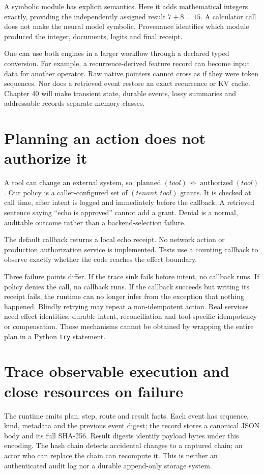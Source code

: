 A symbolic module has explicit semantics. Here it adds mathematical integers
exactly, providing the independently assigned result $7+8=15$. A calculator
call does not make the neural model symbolic. Provenance identifies which
module produced the integer, documents, logits and final receipt.

One can use both engines in a larger workflow through a declared typed
conversion. For example, a recurrence-derived feature record can become input
data for another operator. Raw native pointers cannot cross as if they were
token sequences. Nor does a retrieved event restore an exact recurrence or KV
cache. Chapter 40 will make transient state, durable events, lossy summaries
and addressable records separate memory classes.

\section{Planning an action does not authorize it}
\label{evod39:authority}
A tool can change an external system, so
$\operatorname{planned}(tool)\not\Rightarrow\operatorname{authorized}(tool)$.
Our policy is a caller-configured set of $(tenant,tool)$ grants. It is checked
at call time, after intent is logged and immediately before the callback.
A retrieved sentence saying ``echo is approved'' cannot add a grant.
Denial is a normal, auditable outcome rather than a backend-selection failure.

The default callback returns a local echo receipt. No network action or
production authorization service is implemented. Tests use a counting callback
to observe exactly whether the code reaches the effect boundary.

Three failure points differ. If the trace sink fails before intent, no callback
runs. If policy denies the call, no callback runs. If the callback succeeds
but writing its receipt fails, the runtime can no longer infer from the
exception that nothing happened. Blindly retrying may repeat a non-idempotent
action. Real services need effect identities, durable intent, reconciliation
and tool-specific idempotency or compensation. Those mechanisms cannot be
obtained by wrapping the entire plan in a Python \texttt{try} statement.

\section{Trace observable execution and close resources on failure}
\label{evod39:trace}
The runtime emits plan, step, route and result facts. Each event has sequence,
kind, metadata and the previous event digest; the record stores a canonical
JSON body and its full SHA-256. Result digests identify payload bytes under
this encoding. The hash chain detects accidental changes to a captured chain;
an actor who can replace the chain can recompute it. This is neither an
authenticated audit log nor a durable append-only storage system.

